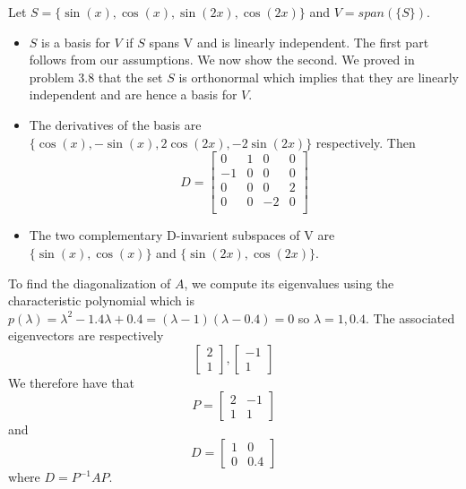 \documentclass[12pt]{article}
\newenvironment{problem}[2][Problem]{\begin{trivlist}
\item[\hskip \labelsep {\bfseries #1}\hskip \labelsep {\bfseries #2}]}{\end{trivlist}}
\begin{document}
\begin{problem}{8.} Let $S = \{\sin(x), \cos(x), \sin(2x), \cos(2x) \}$ and $V = span(\{S\})$. 
\begin{itemize}
\item [(i)] $S$ is a basis for $V$ if $S$ spans V and is linearly independent. The first part follows from our assumptions. We now show the second. We proved in problem 3.8 that the set $S$ is orthonormal which implies that they are linearly independent and are hence a basis for $V$. 
\item [(ii)] The derivatives of the basis are $\{\cos(x), -\sin(x), 2\cos(2x), -2\sin(2x)\}$ respectively. Then \[D=
  \left[ {\begin{array}{cccc}
   0 & 1 & 0 & 0\\
   -1 & 0 & 0 & 0\\
   0 & 0 & 0 & 2\\
   0 & 0 & -2 & 0\\
  \end{array} } \right]
\]
\item [(iii)] The two complementary D-invarient subspaces of V are $\{\sin(x),\cos(x)\}$ and $\{\sin(2x),\cos(2x)\}$. 
\end{itemize}
\end{problem}

\begin{problem}{13.} 
To find the diagonalization of $A$, we compute its eigenvalues using the characteristic polynomial which is $p(\lambda) = \lambda^2-1.4\lambda+0.4 = (\lambda-1)(\lambda-0.4) = 0$ so $\lambda=1,0.4$. The associated eigenvectors are respectively 
\[
\begin{bmatrix}
        2 \\
        1
      \end{bmatrix} ,
   \begin{bmatrix}
        -1 \\
         1
      \end{bmatrix}   
 \] We therefore have that \[
      P =
      \begin{bmatrix}
        2 & -1 \\
        1 & 1
      \end{bmatrix}
\]
and \[
D =
      \begin{bmatrix}
        1 & 0 \\
        0 & 0.4
        \end{bmatrix}
 \]
 where $D = P^{-1}AP $. 
\end{problem}
\end{document}
